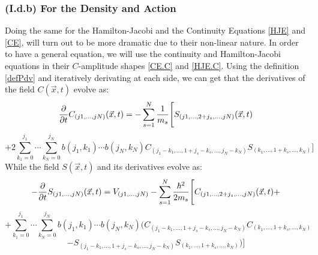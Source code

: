 \documentclass[11pt, a4paper]{article} %
\begin{document}
\subsubsection*{(I.d.b) For the Density and Action}
\vspace{-0.3cm}
Doing the same for the Hamilton-Jacobi and the Continuity Equations \eqref{HJE} and \eqref{CE}, will turn out to be more dramatic due to their non-linear nature. In order to have a general equation, we will use the continuity and Hamilton-Jacobi equations in their $C$-amplitude shapes \eqref{CE.C} and \eqref{HJE.C}. Using the definition \eqref{defPdv} and iteratively derivating at each side, we can get that the derivatives of the field $C(\vec{x},t)$ evolve as:\vspace{-0.2cm}
\begin{equation}\label{infchain.CE}
\pdv{}{t}C_{(j1,...,jN)}(\vec{x},t)=-\sum_{s=1}^N\frac{1}{m_s} \Bigg[S_{(j1,...,2+j_s,...,jN)}(\vec{x},t) 
\end{equation}
$$
+2 \sum_{k_1=0}^{j_1}\cdots\sum_{k_N=0}^{j_N} b(j_1,k_1)\cdots b(j_N,k_N)C_{(j_1-k_1,...,1+j_s-k_s,...,j_N-k_N)}S_{(k_1,...,1+k_s,...,k_N)} \Bigg]
$$
While the field $S(\vec{x},t)$ and its derivatives evolve as:
\begin{equation}\label{infchain.HJE}
-\pdv{}{t}S_{(j1,...,jN)}(\vec{x},t)=V_{(j1,...,jN)}-\sum_{s=1}^N\frac{\hbar^2}{2m_s} \Bigg[ C_{(j1,...,2+j_s,...,jN)}(\vec{x},t)+
\end{equation}
$$
+\sum_{k_1=0}^{j_1}\cdots\sum_{k_N=0}^{j_N} b(j_1,k_1)\cdots b(j_N,k_N) \Bigg( C_{(j_1-k_1,...,1+j_s-k_s,...,j_N-k_N)}C_{(k_1,...,1+k_s,...,k_N)} 
$$
$$
-S_{(j_1-k_1,...,1+j_s-k_s,...,j_N-k_N)}S_{(k_1,...,1+k_s,...,k_N)}  \Bigg)\Bigg]
$$
\end{document}
